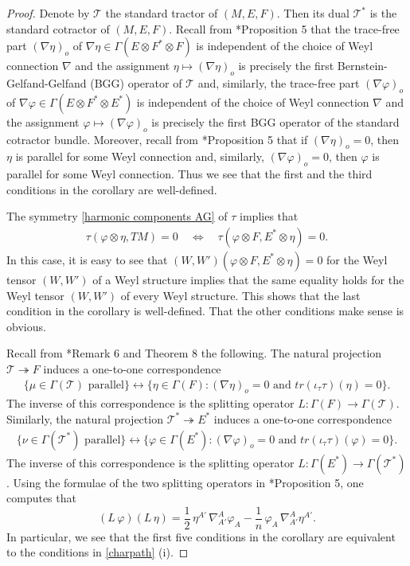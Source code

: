 \documentclass[11pt]{amsart}
\begin{document}
\begin{proof}
Denote by $\mathcal T$ the standard tractor of $(M,E,F)$. Then its dual $\mathcal T^*$ is the standard cotractor of $(M,E,F)$. Recall from \cite{Guo}*{Proposition 5} that the trace-free part $(\nabla\eta)_o$ of $\nabla\eta\in\Gamma(E\otimes F^*\otimes F)$ is independent of the choice of Weyl connection $\nabla$ and the assignment $\eta\mapsto(\nabla\eta)_o$ is precisely the first Bernstein-Gelfand-Gelfand (BGG) operator of $\mathcal T$ and, similarly, the trace-free part $(\nabla\varphi)_o$ of $\nabla\varphi\in\Gamma(E\otimes F^*\otimes E^*)$ is independent of the choice of Weyl connection $\nabla$ and the assignment $\varphi\mapsto(\nabla\varphi)_o$ is precisely the first BGG operator of the standard cotractor bundle. Moreover, recall from \cite{Guo}*{Proposition 5} that if $(\nabla\eta)_o=0$, then $\eta$ is parallel for some Weyl connection and, similarly, $(\nabla\varphi)_o=0$, then $\varphi$ is parallel for some Weyl connection. Thus we see that the first and the third conditions in the corollary are well-defined.

The symmetry \eqref{harmonic components AG} of $\tau$ implies that
\begin{align*}
\tau(\varphi\otimes\eta,TM)=0\quad\iff\quad\tau(\varphi\otimes F,E^*\otimes\eta)=0.
\end{align*}
In this case, it is easy to see that $(W,W')(\varphi\otimes F,E^*\otimes\eta)=0$ for the Weyl tensor $(W,W')$ of a Weyl structure implies that the same equality holds for the Weyl tensor $(W,W')$ of every Weyl structure. This shows that the last condition in the corollary is well-defined. That the other conditions make sense is obvious.

Recall from \cite{Guo}*{Remark 6 and Theorem 8} the following. The natural projection $\mathcal T\twoheadrightarrow F$ induces a one-to-one correspondence
\begin{align*}
\{\mu\in\Gamma(\mathcal T)\text{ parallel}\}
\longleftrightarrow\{\eta\in\Gamma(F):(\nabla\eta)_o=0\text{ and } tr(\iota_{\tau}\tau)(\eta)=0\}.
\end{align*}
The inverse of this correspondence is the splitting operator $L:\Gamma(F)\to\Gamma(\mathcal T)$. Similarly, the natural projection $\mathcal T^*\twoheadrightarrow E^*$ induces a one-to-one correspondence
\begin{align*}
\{\nu\in\Gamma(\mathcal T^*)\text{ parallel}\}
\longleftrightarrow\{\varphi\in\Gamma(E^*):(\nabla\varphi)_o=0\text{ and } tr(\iota_{\tau}\tau)(\varphi)=0\}.
\end{align*}
The inverse of this correspondence is the splitting operator $L:\Gamma(E^*)\to\Gamma(\mathcal T^*)$. Using the formulae of the two splitting operators in \cite{Guo}*{Proposition 5}, one computes that
\[(L\,\varphi)(L\,\eta)=\frac 1 2\,\eta^{A'}\,\nabla^A_{A'}\varphi_{A}-\frac 1 n\,\varphi_A\,\nabla^A_{A'}\eta^{A'}.\] In particular, we see that the first five conditions in the corollary are equivalent to the conditions in \cref{charpath} (i).


\end{proof}
\end{document}
